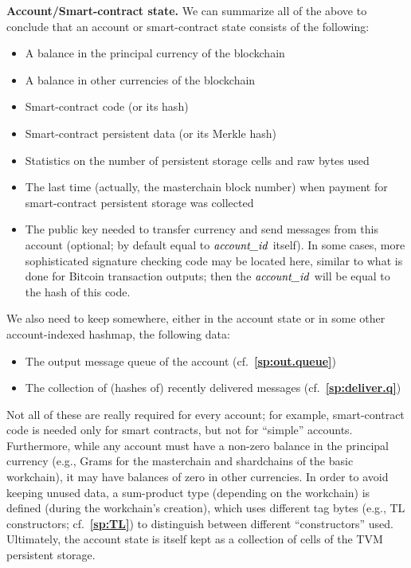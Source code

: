 \documentclass[12pt,oneside]{article}
\def\makepoint#1{\medbreak\noindent{\bf #1.\ }}
\def\nxsubpoint{\refstepcounter{subsubsection}%
  \smallbreak\makepoint{\thesubsubsection}}
\def\refpoint#1{{\rm\textbf{\ref{#1}}}}
\let\ptref=\refpoint
\def\embt(#1.){\textbf{#1.}}
\let\vr=\textit
\def\accountid{\vr{account\_id\/}}
\begin{document}
\nxsubpoint\label{sp:account.state} \embt(Account/Smart-contract
state.)  We can summarize all of the above to conclude that an account
or smart-contract state consists of the following:
\begin{itemize}
\item A balance in the principal currency of the blockchain
\item A balance in other currencies of the blockchain
\item Smart-contract code (or its hash)
\item Smart-contract persistent data (or its Merkle hash)
\item Statistics on the number of persistent storage cells and raw
  bytes used
\item The last time (actually, the masterchain block number) when
  payment for smart-contract persistent storage was collected
\item The public key needed to transfer currency and send messages
  from this account (optional; by default equal to $\accountid$
  itself). In some cases, more sophisticated signature checking code
  may be located here, similar to what is done for Bitcoin transaction
  outputs; then the $\accountid$ will be equal to the hash of this
  code.
\end{itemize}
We also need to keep somewhere, either in the account state or in some
other account-indexed hashmap, the following data:
\begin{itemize}
\item The output message queue of the account
  (cf.~\ptref{sp:out.queue})
\item The collection of (hashes of) recently delivered messages
  (cf.~\ptref{sp:deliver.q})
\end{itemize}

Not all of these are really required for every account; for example,
smart-contract code is needed only for smart contracts, but not for
``simple'' accounts. Furthermore, while any account must have a
non-zero balance in the principal currency (e.g., Grams for the
masterchain and shardchains of the basic workchain), it may have
balances of zero in other currencies. In order to avoid keeping unused
data, a sum-product type (depending on the workchain) is defined
(during the workchain's creation), which uses different tag bytes
(e.g., TL constructors; cf.~\ptref{sp:TL}) to distinguish between
different ``constructors'' used. Ultimately, the account state is
itself kept as a collection of cells of the TVM persistent storage.
\end{document}
